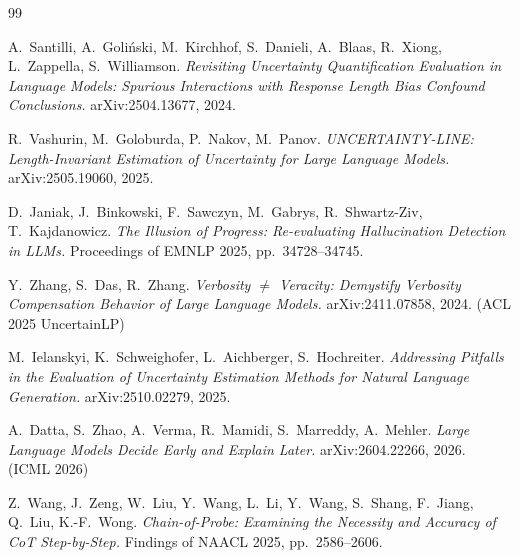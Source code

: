 \documentclass[11pt]{article}
\begin{document}
\begin{thebibliography}{99}

A.~Santilli, A.~Goli\'nski, M.~Kirchhof, S.~Danieli, A.~Blaas, R.~Xiong,
L.~Zappella, S.~Williamson.
\textit{Revisiting Uncertainty Quantification Evaluation in Language Models:
Spurious Interactions with Response Length Bias Confound Conclusions.}
arXiv:2504.13677, 2024.

R.~Vashurin, M.~Goloburda, P.~Nakov, M.~Panov.
\textit{UNCERTAINTY-LINE: Length-Invariant Estimation of Uncertainty for
Large Language Models.} arXiv:2505.19060, 2025.

D.~Janiak, J.~Binkowski, F.~Sawczyn, M.~Gabrys, R.~Shwartz-Ziv, T.~Kajdanowicz.
\textit{The Illusion of Progress: Re-evaluating Hallucination Detection in
LLMs.} Proceedings of EMNLP 2025, pp.~34728--34745.

Y.~Zhang, S.~Das, R.~Zhang.
\textit{Verbosity $\neq$ Veracity: Demystify Verbosity Compensation Behavior
of Large Language Models.} arXiv:2411.07858, 2024. (ACL 2025 UncertainLP)

M.~Ielanskyi, K.~Schweighofer, L.~Aichberger, S.~Hochreiter.
\textit{Addressing Pitfalls in the Evaluation of Uncertainty Estimation
Methods for Natural Language Generation.} arXiv:2510.02279, 2025.

A.~Datta, S.~Zhao, A.~Verma, R.~Mamidi, S.~Marreddy, A.~Mehler.
\textit{Large Language Models Decide Early and Explain Later.}
arXiv:2604.22266, 2026. (ICML 2026)

Z.~Wang, J.~Zeng, W.~Liu, Y.~Wang, L.~Li, Y.~Wang, S.~Shang, F.~Jiang,
Q.~Liu, K.-F.~Wong.
\textit{Chain-of-Probe: Examining the Necessity and Accuracy of CoT
Step-by-Step.} Findings of NAACL 2025, pp.~2586--2606.


\end{thebibliography}
\end{document}
